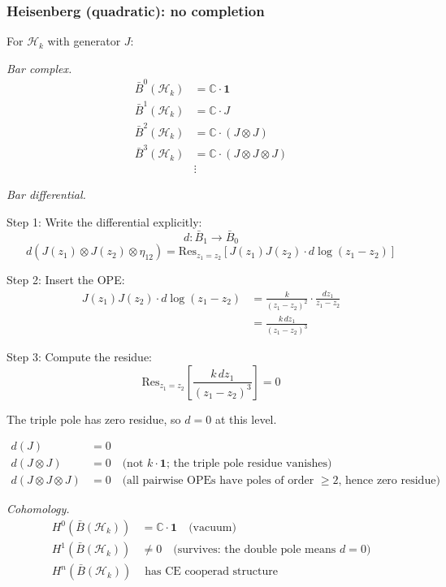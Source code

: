\subsubsection{Heisenberg (quadratic): no completion}

\begin{example}\label{ex:heisenberg-bar-explicit}
For $\mathcal{H}_k$ with generator $J$:

\emph{Bar complex.}
\begin{align}
\bar{B}^0(\mathcal{H}_k) &= \mathbb{C} \cdot \mathbf{1} \\
\bar{B}^1(\mathcal{H}_k) &= \mathbb{C} \cdot J \\
\bar{B}^2(\mathcal{H}_k) &= \mathbb{C} \cdot (J \otimes J) \\
\bar{B}^3(\mathcal{H}_k) &= \mathbb{C} \cdot (J \otimes J \otimes J) \\
&\vdots
\end{align}

\emph{Bar differential.}

Step 1: Write the differential explicitly:
\[d: \bar{B}_1 \to \bar{B}_0\]
\[d(J(z_1) \otimes J(z_2) \otimes \eta_{12}) = \text{Res}_{z_1=z_2}[J(z_1)J(z_2) \cdot d\log(z_1-z_2)]\]

Step 2: Insert the OPE:
\begin{align}
J(z_1)J(z_2) \cdot d\log(z_1-z_2) &= \frac{k}{(z_1-z_2)^2} \cdot \frac{dz_1}{z_1-z_2} \\
&= \frac{k \, dz_1}{(z_1-z_2)^3}
\end{align}

Step 3: Compute the residue:
\[\text{Res}_{z_1=z_2}\left[\frac{k \, dz_1}{(z_1-z_2)^3}\right] = 0\]

The triple pole has zero residue, so $d = 0$ at this level.

\begin{align}
d(J) &= 0 \\
d(J \otimes J) &= 0 \quad \text{(not } k \cdot \mathbf{1}\text{; the triple pole residue vanishes)} \\
d(J \otimes J \otimes J) &= 0 \quad \text{(all pairwise OPEs have poles of order $\geq 2$, hence zero residue)}
\end{align}

\emph{Cohomology.}
\begin{align}
H^0(\bar{B}(\mathcal{H}_k)) &= \mathbb{C} \cdot \mathbf{1} \quad \text{(vacuum)} \\
H^1(\bar{B}(\mathcal{H}_k)) &\neq 0 \quad \text{(survives: the double pole means } d = 0\text{)} \\
H^n(\bar{B}(\mathcal{H}_k)) &\text{ has CE cooperad structure}
\end{align}


\end{example}

